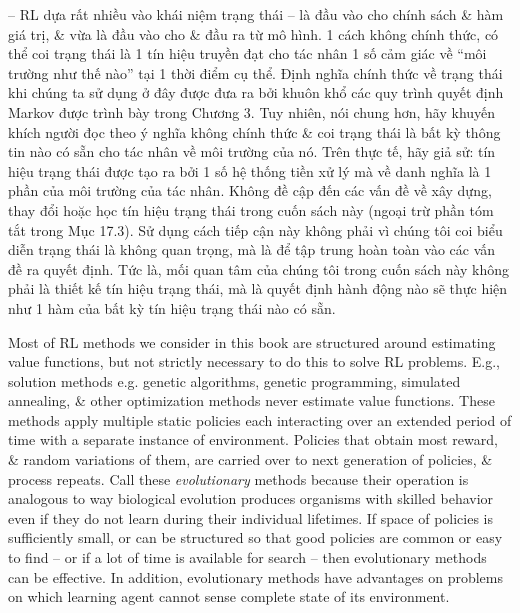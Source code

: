 \documentclass{article}
\begin{document}
\begin{itemize}
\begin{itemize}
        -- RL dựa rất nhiều vào khái niệm trạng thái -- là đầu vào cho chính sách \& hàm giá trị, \& vừa là đầu vào cho \& đầu ra từ mô hình. 1 cách không chính thức, có thể coi trạng thái là 1 tín hiệu truyền đạt cho tác nhân 1 số cảm giác về ``môi trường như thế nào'' tại 1 thời điểm cụ thể. Định nghĩa chính thức về trạng thái khi chúng ta sử dụng ở đây được đưa ra bởi khuôn khổ các quy trình quyết định Markov được trình bày trong Chương 3. Tuy nhiên, nói chung hơn, hãy khuyến khích người đọc theo ý nghĩa không chính thức \& coi trạng thái là bất kỳ thông tin nào có sẵn cho tác nhân về môi trường của nó. Trên thực tế, hãy giả sử: tín hiệu trạng thái được tạo ra bởi 1 số hệ thống tiền xử lý mà về danh nghĩa là 1 phần của môi trường của tác nhân. Không đề cập đến các vấn đề về xây dựng, thay đổi hoặc học tín hiệu trạng thái trong cuốn sách này (ngoại trừ phần tóm tắt trong Mục 17.3). Sử dụng cách tiếp cận này không phải vì chúng tôi coi biểu diễn trạng thái là không quan trọng, mà là để tập trung hoàn toàn vào các vấn đề ra quyết định. Tức là, mối quan tâm của chúng tôi trong cuốn sách này không phải là thiết kế tín hiệu trạng thái, mà là quyết định hành động nào sẽ thực hiện như 1 hàm của bất kỳ tín hiệu trạng thái nào có sẵn.

        Most of RL methods we consider in this book are structured around estimating value functions, but not strictly necessary to do this to solve RL problems. E.g., solution methods e.g. genetic algorithms, genetic programming, simulated annealing, \& other optimization methods never estimate value functions. These methods apply multiple static policies each interacting over an extended period of time with a separate instance of environment. Policies that obtain most reward, \& random variations of them, are carried over to next generation of policies, \& process repeats. Call these {\it evolutionary} methods because their operation is analogous to way biological evolution produces organisms with skilled behavior even if they do not learn during their individual lifetimes. If space of policies is sufficiently small, or can be structured so that good policies are common or easy to find -- or if a lot of time is available for search -- then evolutionary methods can be effective. In addition, evolutionary methods have advantages on problems on which learning agent cannot sense complete state of its environment.


\end{itemize}
\end{itemize}
\end{document}
